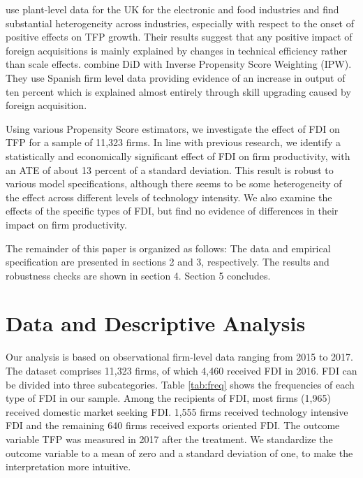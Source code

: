 \documentclass[a4paper,11pt]{scrartcl}
\begin{document}
\citet{girma2007} use plant-level data for the UK for the electronic and food industries and find substantial heterogeneity across industries, especially with respect to the onset of positive effects on TFP growth. Their results suggest that any positive impact of foreign acquisitions is mainly explained by changes in technical efficiency rather than scale effects. \citet{koch2019} combine DiD with Inverse Propensity Score Weighting (IPW). They use Spanish firm level data %
providing evidence of an increase in output of ten percent which is explained almost entirely through skill upgrading caused by foreign acquisition. 

Using various Propensity Score estimators, we investigate the effect of FDI on TFP for a sample of 11,323 firms. In line with previous research, we %
identify a statistically and economically significant effect of FDI on firm productivity, with an ATE of about 13 %
 percent of a standard deviation. This result is robust to various model specifications, although there seems to be some heterogeneity of the effect across different levels of technology intensity. We also examine the effects of the specific types of FDI, but find no evidence of differences in their impact on firm productivity.

The remainder of this paper is organized as follows: The data and empirical specification are presented in sections 2 and 3, respectively. The results and robustness checks are shown in section 4. Section 5 concludes.

\section{Data and Descriptive Analysis}
Our analysis is based on observational firm-level data ranging from 2015 to 2017. The dataset comprises 11,323 firms, of which 4,460 received FDI in 2016. FDI can be divided into three subcategories. Table \ref{tab:freq} shows the frequencies of each type of FDI in our sample. Among the recipients of FDI, most firms (1,965) received domestic market seeking FDI. 1,555 firms received technology intensive FDI and the remaining 640 firms received exports oriented FDI. The outcome variable TFP was measured in 2017 after the treatment. We standardize the outcome variable to a mean of zero and a standard deviation of one, to make the interpretation more intuitive. 
\end{document}
